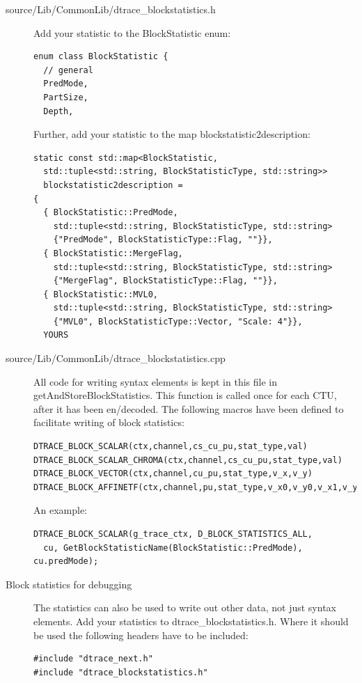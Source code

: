﻿\documentclass[a4paper,11pt]{jvetdoc}
\begin{document}
\begin{description}
\item[source/Lib/CommonLib/dtrace_blockstatistics.h]
  Add your statistic to the BlockStatistic enum:	
\begin{verbatim}
enum class BlockStatistic {
  // general
  PredMode,
  PartSize,
  Depth,
\end{verbatim}
  
Further, add your statistic to the map blockstatistic2description:
\begin{verbatim}
static const std::map<BlockStatistic, 
  std::tuple<std::string, BlockStatisticType, std::string>> 
  blockstatistic2description =
{
  { BlockStatistic::PredMode, 
    std::tuple<std::string, BlockStatisticType, std::string>
    {"PredMode", BlockStatisticType::Flag, ""}},
  { BlockStatistic::MergeFlag,
    std::tuple<std::string, BlockStatisticType, std::string>
    {"MergeFlag", BlockStatisticType::Flag, ""}},
  { BlockStatistic::MVL0,
    std::tuple<std::string, BlockStatisticType, std::string>
    {"MVL0", BlockStatisticType::Vector, "Scale: 4"}},
  YOURS
\end{verbatim}


\item[source/Lib/CommonLib/dtrace_blockstatistics.cpp] All code for
  writing syntax elements is kept in this file in
  getAndStoreBlockStatistics. This function is called once for each
  CTU, after it has been en/decoded. The following macros have been
  defined to facilitate writing of block statistics:
\begin{verbatim}
DTRACE_BLOCK_SCALAR(ctx,channel,cs_cu_pu,stat_type,val)   
DTRACE_BLOCK_SCALAR_CHROMA(ctx,channel,cs_cu_pu,stat_type,val)
DTRACE_BLOCK_VECTOR(ctx,channel,cu_pu,stat_type,v_x,v_y)    
DTRACE_BLOCK_AFFINETF(ctx,channel,pu,stat_type,v_x0,v_y0,v_x1,v_y1,v_x2,v_y2) 
\end{verbatim}

An example:
\begin{verbatim}
DTRACE_BLOCK_SCALAR(g_trace_ctx, D_BLOCK_STATISTICS_ALL, 
  cu, GetBlockStatisticName(BlockStatistic::PredMode), cu.predMode);
\end{verbatim}


\item[Block statistics for debugging] The statistics can also be used
  to write out other data, not just syntax elements. Add your
  statistics to dtrace_blockstatistics.h. Where it should be used the
  following headers have to be included:
\begin{verbatim}
#include "dtrace_next.h"
#include "dtrace_blockstatistics.h"
\end{verbatim}
\end{description}
\end{document}
